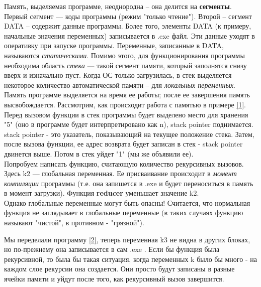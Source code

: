 \begin{lecture}[\lectureSubject]
	\begin{lecSection}
		Память, выделяемая программе, неоднородна -- она делится на \textbf{сегменты}. Первый сегмент --- коды программы (режим "только чтение"). Второй -- сегмент DATA -- содержит данные программы. Более того, элементы DATA (к примеру, начальные значения переменных) записывается в .exe файл. Эти данные уходят в оперативку при запуске программы. Переменные, записанные в DATA, называются \textit{статическими}. Помимо этого, для функционирования программы необходима область \textit{стека} --- такой сегмент памяти, который заполнятся снизу вверх и изначально пуст. Когда ОС только загрузилась, в стек выделяется некоторое количество автоматической памяти -- для \textit{локальных переменных}. \\ 
		Память программе выделяется на время ее работы; после ее завершения память высвобождается.
		Рассмотрим, как происходит работа с памятью в примере \ref{1}. Перед вызовом функции в стек программы будет выделено место для хранения "5" (оно в программе будет интерпретировано как n), stack pointer поднимается. stack pointer - это указатель, показывающий на текущее положение стека. Затем, после вызова функции, ее адрес возврата будет записан в стек - stack pointer двинется выше. Потом в стек уйдет "1" (мы же объявили ее). \\
		Попробуем написать функцию, считающую количество рекурсивных вызовов.
		Здесь k2 --- глобальная переменная. Ее присваивание происходит в \textit{момент компиляции} программы (т.е. она запишется в .exe и будет переноситься в память в момент загрузки). Функция \textbf{reducer} уменьшает значение k2. \\
		Однако глобальные переменные могут быть опасны! Считается, что нормальная функция не заглядывает в глобальные переменные (в таких случаях функцию называют "чистой", в противном - "грязной").
		\end{lecSection}
		\begin{lecSection}
		Мы переделали программу \ref{2}, теперь переменная k3 не видна в других блоках, но по-прежнему она записывается в сам .exe . Если бы функция была рекурсивной, то была бы такая ситуация, когда переменных k было бы много - на каждом слое рекурсии она создается. Они просто будут записаны в разные ячейки памяти и уйдут после того, как рекурсивный вызов завершится. 

\end{lecSection}
\end{lecture}
